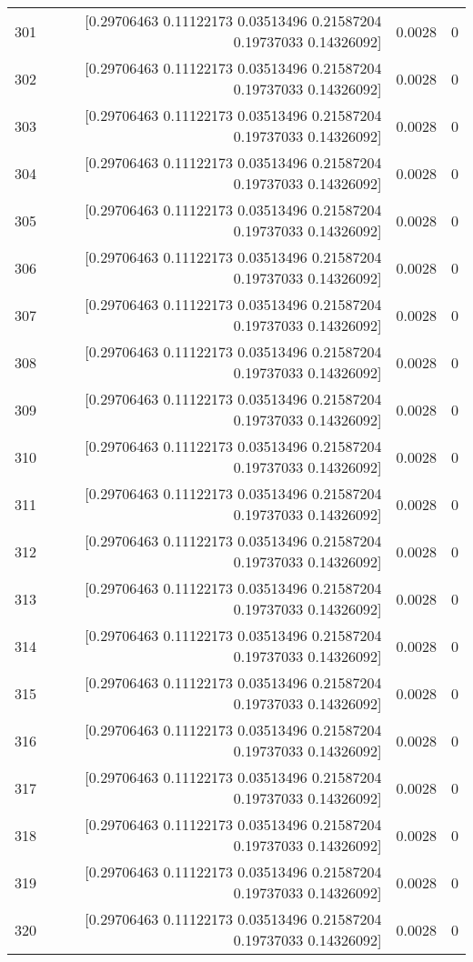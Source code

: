\begin{longtable}{lrrr}
301 & [0.29706463 0.11122173 0.03513496 0.21587204 0.19737033 0.14326092] & 0.0028 & 0 \\
302 & [0.29706463 0.11122173 0.03513496 0.21587204 0.19737033 0.14326092] & 0.0028 & 0 \\
303 & [0.29706463 0.11122173 0.03513496 0.21587204 0.19737033 0.14326092] & 0.0028 & 0 \\
304 & [0.29706463 0.11122173 0.03513496 0.21587204 0.19737033 0.14326092] & 0.0028 & 0 \\
305 & [0.29706463 0.11122173 0.03513496 0.21587204 0.19737033 0.14326092] & 0.0028 & 0 \\
306 & [0.29706463 0.11122173 0.03513496 0.21587204 0.19737033 0.14326092] & 0.0028 & 0 \\
307 & [0.29706463 0.11122173 0.03513496 0.21587204 0.19737033 0.14326092] & 0.0028 & 0 \\
308 & [0.29706463 0.11122173 0.03513496 0.21587204 0.19737033 0.14326092] & 0.0028 & 0 \\
309 & [0.29706463 0.11122173 0.03513496 0.21587204 0.19737033 0.14326092] & 0.0028 & 0 \\
310 & [0.29706463 0.11122173 0.03513496 0.21587204 0.19737033 0.14326092] & 0.0028 & 0 \\
311 & [0.29706463 0.11122173 0.03513496 0.21587204 0.19737033 0.14326092] & 0.0028 & 0 \\
312 & [0.29706463 0.11122173 0.03513496 0.21587204 0.19737033 0.14326092] & 0.0028 & 0 \\
313 & [0.29706463 0.11122173 0.03513496 0.21587204 0.19737033 0.14326092] & 0.0028 & 0 \\
314 & [0.29706463 0.11122173 0.03513496 0.21587204 0.19737033 0.14326092] & 0.0028 & 0 \\
315 & [0.29706463 0.11122173 0.03513496 0.21587204 0.19737033 0.14326092] & 0.0028 & 0 \\
316 & [0.29706463 0.11122173 0.03513496 0.21587204 0.19737033 0.14326092] & 0.0028 & 0 \\
317 & [0.29706463 0.11122173 0.03513496 0.21587204 0.19737033 0.14326092] & 0.0028 & 0 \\
318 & [0.29706463 0.11122173 0.03513496 0.21587204 0.19737033 0.14326092] & 0.0028 & 0 \\
319 & [0.29706463 0.11122173 0.03513496 0.21587204 0.19737033 0.14326092] & 0.0028 & 0 \\
320 & [0.29706463 0.11122173 0.03513496 0.21587204 0.19737033 0.14326092] & 0.0028 & 0 \\

\end{longtable}
